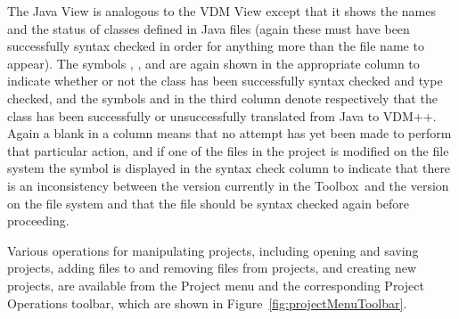\documentclass[\pformat,12pt]{article}
\newcommand{\vdmslpp}{VDM++}
\newcommand{\Toolbox}{Toolbox}
\newcommand{\guicmd}[1]{{\sf #1}}
\begin{document}
The \guicmd{Java View} is analogous to the \guicmd{VDM View} except
that it shows the names and the status of classes defined in Java
files (again these must have been successfully syntax checked in order
for anything more than the file name to appear). The
symbols 
,
,
 and
are again shown in the appropriate column to indicate whether or not
the class has been successfully syntax checked and type checked, and
the symbols 
and
in the third column denote respectively that the class has been
successfully or unsuccessfully translated from Java to \vdmslpp.
Again a blank in a column means that no attempt has yet been made to
perform that particular action, and if one of the files in the project
is modified on the file system the symbol
is displayed in the \guicmd{syntax check} column  to indicate
that there is an inconsistency between the version currently in the \Toolbox\ and the
version on the file system and that the file should be syntax checked
again before proceeding.



Various operations for manipulating projects, including opening and
saving projects, adding files to and removing files from projects, and
creating new projects, are available from the \guicmd{Project}
menu and the corresponding \guicmd{Project
  Operations} toolbar, which are
shown in Figure~\ref{fig:projectMenuToolbar}.
\end{document}
